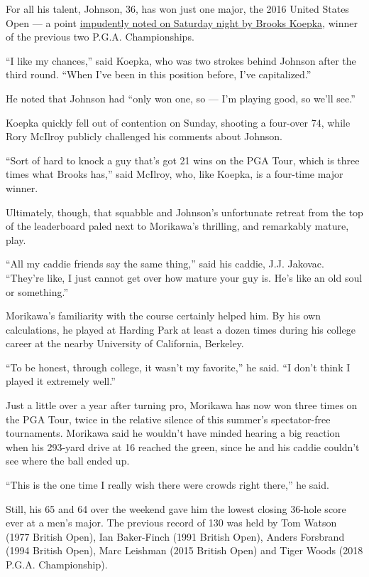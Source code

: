 For all his talent, Johnson, 36, has won just one major, the 2016 United
States Open --- a point
\href{https://www.nytimes3xbfgragh.onion/2020/08/07/sports/brooks-koepka-pga-championship.html}{impudently
noted on Saturday night by Brooks Koepka}, winner of the previous two
P.G.A. Championships.

``I like my chances,'' said Koepka, who was two strokes behind Johnson
after the third round. ``When I've been in this position before, I've
capitalized.''

He noted that Johnson had ``only won one, so --- I'm playing good, so
we'll see.''

Koepka quickly fell out of contention on Sunday, shooting a four-over
74, while Rory McIlroy publicly challenged his comments about Johnson.

``Sort of hard to knock a guy that's got 21 wins on the PGA Tour, which
is three times what Brooks has,'' said McIlroy, who, like Koepka, is a
four-time major winner.

Ultimately, though, that squabble and Johnson's unfortunate retreat from
the top of the leaderboard paled next to Morikawa's thrilling, and
remarkably mature, play.

``All my caddie friends say the same thing,'' said his caddie, J.J.
Jakovac. ``They're like, I just cannot get over how mature your guy is.
He's like an old soul or something.''

Morikawa's familiarity with the course certainly helped him. By his own
calculations, he played at Harding Park at least a dozen times during
his college career at the nearby University of California, Berkeley.

``To be honest, through college, it wasn't my favorite,'' he said. ``I
don't think I played it extremely well.''

Just a little over a year after turning pro, Morikawa has now won three
times on the PGA Tour, twice in the relative silence of this summer's
spectator-free tournaments. Morikawa said he wouldn't have minded
hearing a big reaction when his 293-yard drive at 16 reached the green,
since he and his caddie couldn't see where the ball ended up.

``This is the one time I really wish there were crowds right there,'' he
said.

Still, his 65 and 64 over the weekend gave him the lowest closing
36-hole score ever at a men's major. The previous record of 130 was held
by Tom Watson (1977 British Open), Ian Baker-Finch (1991 British Open),
Anders Forsbrand (1994 British Open), Marc Leishman (2015 British Open)
and Tiger Woods (2018 P.G.A. Championship).

